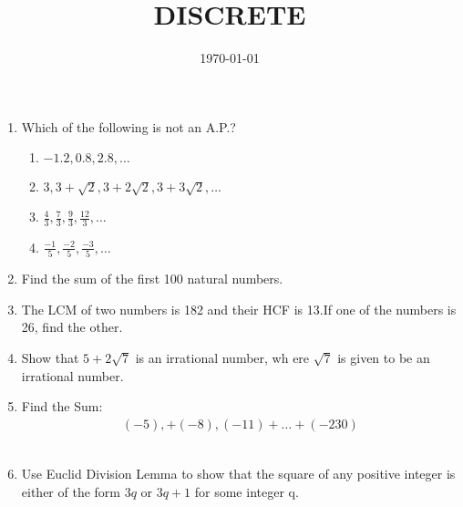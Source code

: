 \documentclass{article}
\title{DISCRETE}
\date{ \today}
\begin{document}
\maketitle
\begin{enumerate}
\section*{DISCRETE CBSE-10}
\item Which of the following is not an A.P.? 
	\begin{enumerate}[label =(\Alph*)]
	\item $-1.2,0.8,2.8,\dots$ 

	\item $3,3+\sqrt2,3+2\sqrt2,3+3\sqrt2,\dots$ 

	\item $\frac{4}{3},\frac{7}{3},\frac{9}{3},\frac{12}{3},\dots$ 

	\item $\frac{-1}{5},\frac{-2}{5},\frac{-3}{5},\dots$ \\
\end{enumerate}
\item Find the sum of the first 100 natural numbers.\\
						     
\item The LCM of two numbers is 182 and their HCF is 13.If one of the numbers is 26, find the other.\\

\item Show that $5+2\sqrt7$ is an irrational number, wh    ere $\sqrt7$ is given to be an irrational number.
\\
\item Find the Sum:
	\begin{align}
	(-5),+(-8),(-11)+\dots+(-230)
        \end{align}
\\
\item Use Euclid Division Lemma to show that the square of any positive 
integer is either of the form $3q$ or $3q+1$ for some integer q.
\end{enumerate}
\end{document}
